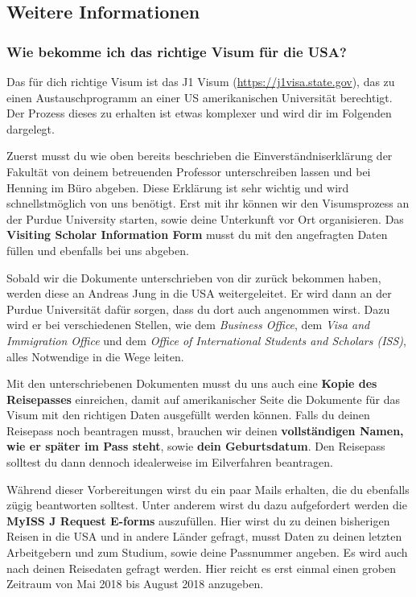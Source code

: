 \documentclass[
  paper=a4,
  fontsize=12pt,
  DIV=16,
  headheight=52pt,
  footheight=45pt,
  headinclude,
  parskip=full,
]{scrartcl}
\begin{document}
\subsection*{Weitere Informationen}
\subsubsection*{Wie bekomme ich das richtige Visum für die USA?}
Das für dich richtige Visum ist das J1 Visum (\url{https://j1visa.state.gov}), das zu einen Austauschprogramm an einer US amerikanischen Universität berechtigt.
Der Prozess dieses zu erhalten ist etwas komplexer und wird dir im Folgenden dargelegt.

Zuerst musst du wie oben bereits beschrieben die Einverständniserklärung der Fakultät von deinem betreuenden Professor unterschreiben lassen und bei Henning im Büro
abgeben.
Diese Erklärung ist sehr wichtig und wird schnellstmöglich von uns benötigt.
Erst mit ihr können wir den Visumsprozess an der Purdue University starten, sowie deine Unterkunft vor Ort organisieren.
Das \textbf{Visiting Scholar Information Form} musst du mit den angefragten Daten füllen und ebenfalls bei uns abgeben.

Sobald wir die Dokumente unterschrieben von dir zurück bekommen haben, werden diese an Andreas Jung in die USA weitergeleitet.
Er wird dann an der Purdue Universität dafür sorgen, dass du dort auch angenommen wirst.
Dazu wird er bei verschiedenen Stellen, wie dem \textit{Business Office}, dem \textit{Visa and Immigration Office} und dem \textit{Office of International Students and Scholars (ISS)}, alles Notwendige in die Wege leiten.

Mit den unterschriebenen Dokumenten musst du uns auch eine \textbf{Kopie des Reisepasses} einreichen, damit auf amerikanischer Seite die Dokumente für das Visum mit den richtigen Daten ausgefüllt werden können.
Falls du deinen Reisepass noch beantragen musst, brauchen wir deinen \textbf{vollständigen Namen, wie er später im Pass steht}, sowie \textbf{dein Geburtsdatum}.
Den Reisepass solltest du dann dennoch idealerweise im Eilverfahren beantragen.

Während dieser Vorbereitungen wirst du ein paar Mails erhalten, die du
ebenfalls zügig beantworten solltest.
Unter anderem wirst du dazu aufgefordert werden die \textbf{MyISS J Request E-forms} auszufüllen.
Hier wirst du zu deinen bisherigen Reisen in die USA und in andere Länder gefragt, musst Daten zu deinen letzten Arbeitgebern und zum Studium, sowie deine Passnummer angeben.
Es wird auch nach deinen Reisedaten gefragt werden.
Hier reicht es erst einmal einen groben Zeitraum von Mai 2018 bis August 2018 anzugeben.
\end{document}
